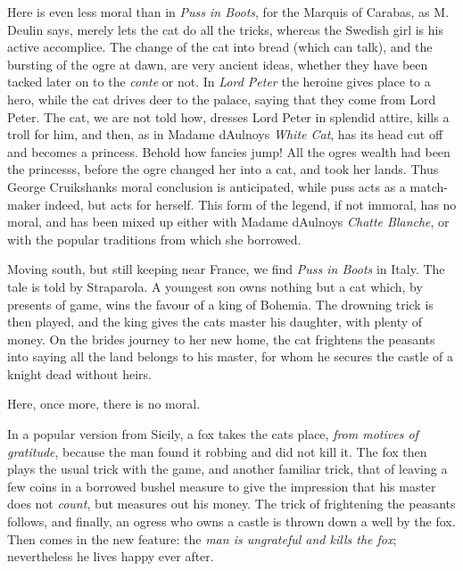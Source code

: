 \documentclass[14pt,a4paper]{memoir}
\begin{document}
{Here is even less moral than in \emph{Puss in Boots}, for the Marquis of
Carabas, as M. Deulin says, merely lets the cat do all the tricks,
whereas the Swedish girl is his active accomplice. The change of the cat
into bread (which can talk), and the bursting of the ogre at dawn, are
very ancient ideas, whether they have been tacked later on to the
\emph{conte} or not. In \emph{Lord Peter} the heroine gives place to a
hero, while the cat drives deer to the palace, saying that they come
from Lord Peter. The cat, we are not told how, dresses Lord Peter in
splendid attire, kills a troll for him, and then, as in Madame
d\textquotesingle Aulnoy\textquotesingle s \emph{White Cat}, has its
head cut off and becomes a princess. Behold how fancies jump! All the
ogre\textquotesingle s wealth had been the princess\textquotesingle s,
before the ogre changed her into a cat, and took her lands. Thus George
Cruikshank\textquotesingle s moral conclusion is anticipated, while puss
acts as a match-maker indeed, but acts for herself. This form of the
legend, if not immoral, has no moral, and has been mixed up either with
Madame d\textquotesingle Aulnoy\textquotesingle s \emph{Chatte Blanche},
or with the popular traditions from which she borrowed.

Moving south, but still keeping near France, we find \emph{Puss in
Boots} in Italy. The tale is told by
Straparola.
A youngest son owns nothing but a cat which, by presents of game, wins
the favour of a king of Bohemia. The drowning trick is then played, and
the king gives the cat\textquotesingle s master his daughter, with
plenty of money. On the bride\textquotesingle s journey to her new home,
the cat frightens the peasants into saying all the land belongs to his
master, for whom he secures the castle of a knight dead without heirs.

Here, once more, there is no moral.

In a popular version from
Sicily,
a fox takes the cat\textquotesingle s place, \emph{from motives of
gratitude}, because the man found it robbing and did not kill it. The
fox then plays the usual trick with the game, and another familiar
trick, that of leaving a few coins in a borrowed bushel measure to give
the impression that his master does not \emph{count}, but measures out
his money. The trick of frightening the peasants follows, and finally,
an ogress who owns a castle is thrown down a well by the fox. Then comes
in the new feature: the \emph{man is ungrateful and kills the fox};
nevertheless he lives happy ever after.

}
\end{document}

